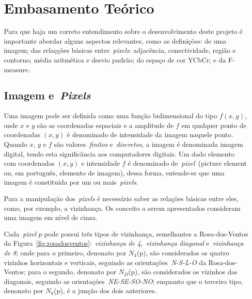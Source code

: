 \documentclass[conference]{Trabalho_1}
\begin{document}


\section{Embasamento Te\'orico}
Para que haja um correto entendimento sobre o desenvolvimento deste projeto \'e importante abordar alguns aspectos relevantes, como as defini\c{c}\~oes: de uma imagem; das rela\c{c}\c{c}\~oes b\'asicas entre~\textit{pixels}: adjac\^encia, conectividade, regi\~ao e contorno; m\'edia aritm\'etica e desvio padr\~ao; do espa\c{c}o de cor YCbCr; e da F-measure.

\subsection{Imagem e~\textit{Pixels}}
Uma imagem pode ser definida como uma fun\c{c}\~ao bidimensional do tipo $f(x,y)$, onde $x$ e $y$ s\~ao as coordenadas espaciais e a amplitude de $f$ em qualquer ponto de coordenadas $(x,y)$ \'e denominado de intensidade da imagem naquele ponto. Quando $x$, $y$ e $f$ s\~ao valores~\textit{finitos} e~\textit{discretos}, a imagem \'e denominada imagem digital, tendo esta signific\^ancia aos computadores digitais. Um dado elemento com coordenadas $(x,y)$ e intensidade $f$ \'e denominado de~\textit{pixel}~(picture element ou, em portugu\^es, elemento de imagem), dessa forma, entende-se que uma imagem \'e constituida por um ou mais~\textit{pixels}.

Para a manipula\c{c}\~ao dos~\textit{pixels} \'e necess\'ario saber as rela\c{c}\~oes b\'asicas entre eles, como, por exemplo, a vizinhan\c{c}a. Os conceito a serem apresentados consideram uma imagem em n\'ivel de cinza.

Cada~\textit{pixel} $p$ pode possui tr\^es tipos de vizinhan\c{c}a, semelhantes a Rosa-dos-Ventos da Figura~\ref{fig:rosadosventos}:~\textit{vizinhan\c{c}a de 4},~\textit{vizinhan\c{c}a diagonal} e~\textit{vizinhan\c{c}a de 8}; onde para o primeiro, denonato por $N_4$(p), s\~ao considerados os quatro vizinhos horizontais e verticais, seguindo as orienta\c{c}\~oes~\textit{N-S-L-O} da Rosa-dos-Ventos; para o segundo, denonato por $N_D$(p), s\~ao considerados os vizinhos das diagonais, seguindo as orienta\c{c}\~oes~\textit{NE-SE-SO-NO}; enquanto que o terceiro tipo, denonato por $N_8$(p), \'e a jun\c{c}\~ao dos dois anteriores.
\end{document}
